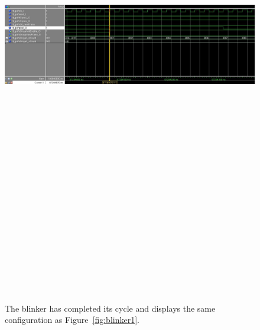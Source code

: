 \documentclass[twoside, letterpaper]{report}
\begin{document}
\begin{figure}
\label{fig:blinker4}
\centering
\includegraphics[angle=90, height=9in]{./media/blinker_4.jpg}
\caption{\label{fig:blinker4}The blinker has completed its cycle and displays the same configuration as Figure~\ref{fig:blinker1}.}
\end{figure}
\end{document}
